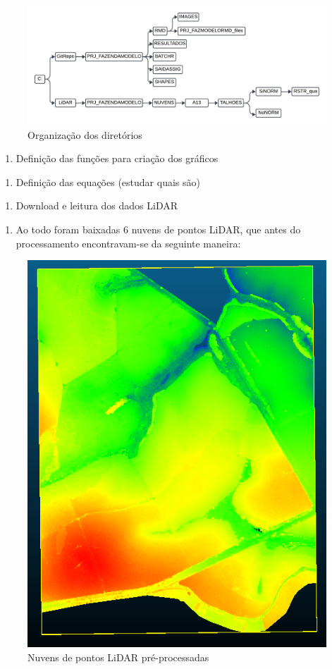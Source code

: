 \documentclass[
]{article}
\providecommand{\tightlist}{%
  \setlength{\itemsep}{0pt}\setlength{\parskip}{0pt}}
\begin{document}
\begin{figure}

{\centering \includegraphics[width=0.8\linewidth]{IMAGES/organizacao-pastas} 

}

\caption{Organização dos diretórios}\label{fig:unnamed-chunk-7}
\end{figure}
\newpage

\begin{enumerate}
\def\labelenumi{\arabic{enumi}.}
\setcounter{enumi}{2}
\tightlist
\item
  Definição das funções para criação dos gráficos
\end{enumerate}

\newpage

\begin{enumerate}
\def\labelenumi{\arabic{enumi}.}
\setcounter{enumi}{3}
\tightlist
\item
  Definição das equações (estudar quais são)
\end{enumerate}

\newpage

\begin{enumerate}
\def\labelenumi{\arabic{enumi}.}
\setcounter{enumi}{4}
\tightlist
\item
  Download e leitura dos dados LiDAR
\end{enumerate}

\begin{enumerate}
\def\labelenumi{\roman{enumi}.}
\tightlist
\item
  Ao todo foram baixadas 6 nuvens de pontos LiDAR, que antes do
  processamento encontravam-se da seguinte maneira:
\end{enumerate}

\begin{figure}

{\centering \includegraphics[width=0.4\linewidth]{IMAGES/pre-clipagem-passo8} 

}

\caption{Nuvens de pontos LiDAR pré-processadas}\label{fig:unnamed-chunk-8}
\end{figure}
\end{document}
